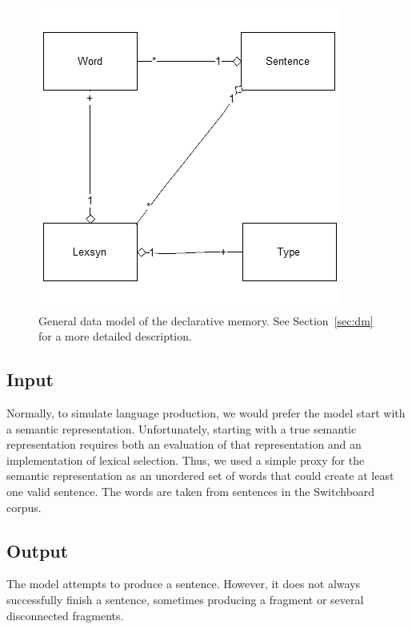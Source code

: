 \begin{figure}[ht]
\begin{center}
\includegraphics[width=0.95\columnwidth]{figures/prodtypes}
\end{center}
\caption{General data model of the declarative memory. See Section~\ref{sec:dm} for a more detailed description.}  
\label{fig:dm}
\end{figure}

\subsection{Input}
Normally, to simulate language production, we would prefer the model start with a semantic representation. Unfortunately, starting with a true semantic representation requires both an evaluation of that representation and an implementation of lexical selection. Thus, we used a simple proxy for the semantic representation as an unordered set of words that could create at least one valid sentence. The words are taken from sentences in the Switchboard corpus.

\subsection{Output}
The model attempts to produce a sentence. However, it does not always successfully finish a sentence, sometimes producing a fragment or several disconnected fragments.

